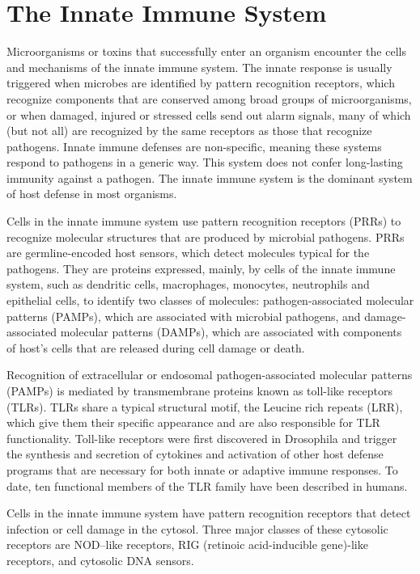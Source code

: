 \hypertarget{the-innate-immune-system}{%
\section{The Innate Immune System}\label{the-innate-immune-system}}

Microorganisms or toxins that successfully enter an organism encounter the cells and mechanisms of the innate immune system. The innate response is usually triggered when microbes are identified by pattern recognition receptors, which recognize components that are conserved among broad groups of microorganisms, or when damaged, injured or stressed cells send out alarm signals, many of which (but not all) are recognized by the same receptors as those that recognize pathogens. Innate immune defenses are non-specific, meaning these systems respond to pathogens in a generic way. This system does not confer long-lasting immunity against a pathogen. The innate immune system is the dominant system of host defense in most organisms.

Cells in the innate immune system use pattern recognition receptors (PRRs) to recognize molecular structures that are produced by microbial pathogens. PRRs are germline-encoded host sensors, which detect molecules typical for the pathogens. They are proteins expressed, mainly, by cells of the innate immune system, such as dendritic cells, macrophages, monocytes, neutrophils and epithelial cells, to identify two classes of molecules: pathogen-associated molecular patterns (PAMPs), which are associated with microbial pathogens, and damage-associated molecular patterns (DAMPs), which are associated with components of host's cells that are released during cell damage or death.

Recognition of extracellular or endosomal pathogen-associated molecular patterns (PAMPs) is mediated by transmembrane proteins known as toll-like receptors (TLRs). TLRs share a typical structural motif, the Leucine rich repeats (LRR), which give them their specific appearance and are also responsible for TLR functionality. Toll-like receptors were first discovered in Drosophila and trigger the synthesis and secretion of cytokines and activation of other host defense programs that are necessary for both innate or adaptive immune responses. To date, ten functional members of the TLR family have been described in humans.

Cells in the innate immune system have pattern recognition receptors that detect infection or cell damage in the cytosol. Three major classes of these cytosolic receptors are NOD--like receptors, RIG (retinoic acid-inducible gene)-like receptors, and cytosolic DNA sensors.


